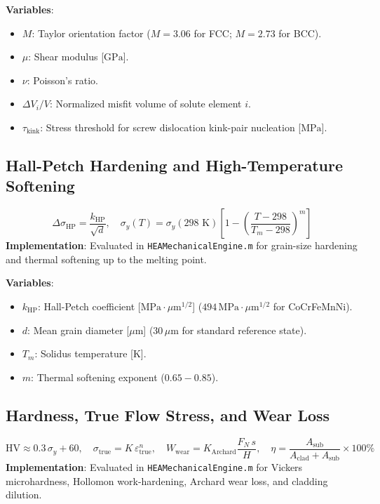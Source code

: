 \documentclass[11pt,a4paper]{article}
\begin{document}
\noindent\textbf{Variables}:
\begin{itemize}
  \item $M$: Taylor orientation factor ($M = 3.06$ for FCC; $M = 2.73$ for BCC).
  \item $\mu$: Shear modulus [$\text{GPa}$].
  \item $\nu$: Poisson's ratio.
  \item $\Delta V_i / V$: Normalized misfit volume of solute element $i$.
  \item $\tau_{\text{kink}}$: Stress threshold for screw dislocation kink-pair nucleation [$\text{MPa}$].
\end{itemize}

\subsection{Hall-Petch Hardening and High-Temperature Softening}
\begin{equation}
\Delta\sigma_{\text{HP}} = \frac{k_{\text{HP}}}{\sqrt{d}}, \quad \sigma_y(T) = \sigma_y(298\text{ K}) \left[ 1 - \left(\frac{T - 298}{T_m - 298}\right)^m \right]
\end{equation}
\textbf{Implementation}: Evaluated in \texttt{HEAMechanicalEngine.m} for grain-size hardening and thermal softening up to the melting point.

\noindent\textbf{Variables}:
\begin{itemize}
  \item $k_{\text{HP}}$: Hall-Petch coefficient [$\text{MPa}\cdot\mu\text{m}^{1/2}$] ($494 \, \text{MPa}\cdot\mu\text{m}^{1/2}$ for CoCrFeMnNi).
  \item $d$: Mean grain diameter [$\mu\text{m}$] ($30 \, \mu\text{m}$ for standard reference state).
  \item $T_m$: Solidus temperature [$\text{K}$].
  \item $m$: Thermal softening exponent ($0.65 - 0.85$).
\end{itemize}

\subsection{Hardness, True Flow Stress, and Wear Loss}
\begin{equation}
\text{HV} \approx 0.3 \, \sigma_y + 60, \quad \sigma_{\text{true}} = K \, \varepsilon_{\text{true}}^n, \quad W_{\text{wear}} = K_{\text{Archard}} \frac{F_N \, s}{H}, \quad \eta = \frac{A_{\text{sub}}}{A_{\text{clad}} + A_{\text{sub}}} \times 100\%
\end{equation}
\textbf{Implementation}: Evaluated in \texttt{HEAMechanicalEngine.m} for Vickers microhardness, Hollomon work-hardening, Archard wear loss, and cladding dilution.
\end{document}
